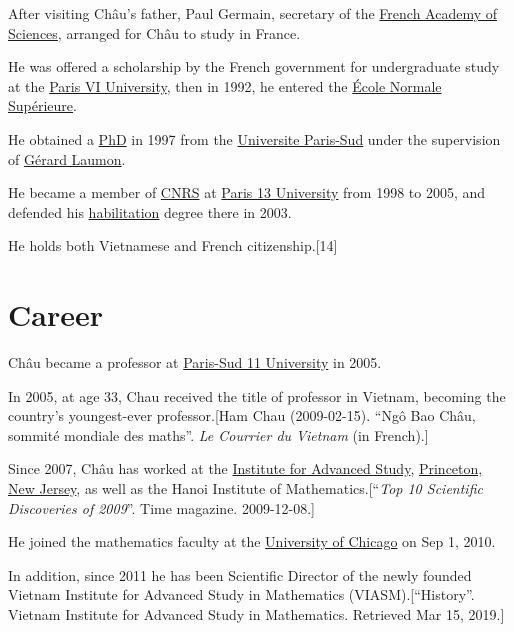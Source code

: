 \documentclass{book}
\numberwithin{equation}{section}
\begin{document}
After visiting Châu's father, Paul Germain, secretary of the \href{https://en.wikipedia.org/wiki/French_Academy_of_Sciences}{French Academy of Sciences}, arranged for Châu to study in France.

He was offered a scholarship by the French government for undergraduate study at the \href{https://en.wikipedia.org/wiki/Paris_VI_University}{Paris VI University}, then in 1992, he entered the \href{https://en.wikipedia.org/wiki/%C3%89cole_Normale_Sup%C3%A9rieure}{École Normale Supérieure}.

He obtained a \href{https://en.wikipedia.org/wiki/Doctor_of_Philosophy}{PhD} in 1997 from the \href{https://en.wikipedia.org/wiki/Universite_Paris-Sud}{Universite Paris-Sud} under the supervision of \href{https://en.wikipedia.org/wiki/G%C3%A9rard_Laumon}{Gérard Laumon}.
    
He became a member of \href{https://en.wikipedia.org/wiki/CNRS}{CNRS} at \href{https://en.wikipedia.org/wiki/Paris_13_University}{Paris 13 University} from 1998 to 2005, and defended his \href{https://en.wikipedia.org/wiki/Habilitation}{habilitation} degree there in 2003.

He holds both Vietnamese and French citizenship.[14]

\section{Career}
Châu became a professor at \href{https://en.wikipedia.org/wiki/Paris-Sud_11_University}{Paris-Sud 11 University} in 2005.

In 2005, at age 33, Chau received the title of professor in Vietnam, becoming the country's youngest-ever professor.[Ham Chau (2009-02-15). ``Ngô Bao Châu, sommité mondiale des maths''. \textit{Le Courrier du Vietnam} (in French).]

Since 2007, Châu has worked at the \href{https://en.wikipedia.org/wiki/Institute_for_Advanced_Study}{Institute for Advanced Study}, \href{https://en.wikipedia.org/wiki/Princeton,_New_Jersey}{Princeton, New Jersey}, as well as the Hanoi Institute of Mathematics.[``\textit{Top 10 Scientific Discoveries of 2009}''. Time magazine. 2009-12-08.]

He joined the mathematics faculty at the \href{https://en.wikipedia.org/wiki/University_of_Chicago}{University of Chicago} on Sep 1, 2010.

In addition, since 2011 he has been Scientific Director of the newly founded Vietnam Institute for Advanced Study in Mathematics (VIASM).[``History''. Vietnam Institute for Advanced Study in Mathematics. Retrieved Mar 15, 2019.]
\end{document}
